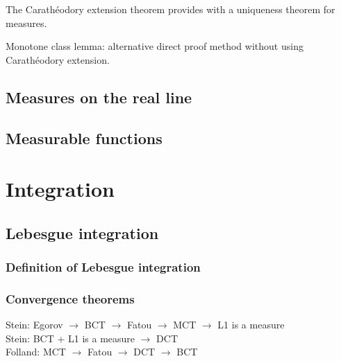 \documentclass{../note}
\begin{document}
\begin{prb}
The Carath\'eodory extension theorem provides with a uniqueness theorem for measures.
\end{prb}



Monotone class lemma: alternative direct proof method without using Carath\'eodory extension.


\chapter{Measures on the real line}



\chapter{Measurable functions}






\part{Integration}

\chapter{Lebesgue integration}
\section{Definition of Lebesgue integration}
\section{Convergence theorems}

Stein: Egorov $\to$ BCT $\to$ Fatou $\to$ MCT $\to$ L1 is a measure\\
Stein: BCT + L1 is a measure $\to$ DCT\\
Folland: MCT $\to$ Fatou $\to$ DCT $\to$ BCT
\end{document}
